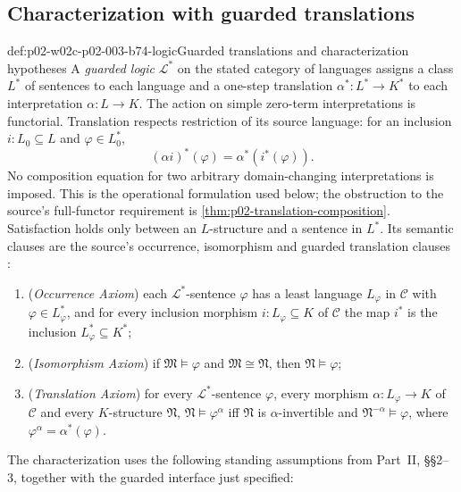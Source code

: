 
\subsection{Characterization with guarded translations}
\begin{hbdefinition}{def:p02-w02c-p02-003-b74-logic}{Guarded translations and characterization hypotheses}
A \emph{guarded logic} \(\mathcal L^{\ast}\) on the stated category of
languages assigns a class \(L^{\ast}\) of sentences to each language
and a one-step translation \(\alpha^{\ast}:L^{\ast}\to K^{\ast}\)
to each interpretation \(\alpha:L\to K\). The action on simple
zero-term interpretations is functorial. Translation respects restriction
of its source language: for an inclusion \(i:L_0\subseteq L\) and
\(\varphi\in L_0^{\ast}\),
\[
 (\alpha i)^{\ast}(\varphi)=\alpha^{\ast}(i^{\ast}(\varphi)).
\]
No composition equation for two arbitrary domain-changing
interpretations is imposed. This is the operational formulation used
below; the obstruction to the source's full-functor requirement is
\cref{thm:p02-translation-composition}. Satisfaction holds only between
an \(L\)-structure and a sentence in \(L^{\ast}\). Its semantic clauses
are the source's occurrence, isomorphism and guarded translation clauses
\cite[Part~I, \S7, pp.~234--235]{Barwise1974Axioms}:
\begin{enumerate}
\item (\emph{Occurrence Axiom}) each \(\mathcal L^{\ast}\)-sentence
      \(\varphi\) has a least language \(L_\varphi\) in \(\mathcal C\) with
      \(\varphi\in L_\varphi^{\ast}\), and for every inclusion morphism
      \(i:L_\varphi\subseteq K\) of \(\mathcal C\) the map \(i^{\ast}\) is the
      inclusion \(L_\varphi^{\ast}\subseteq K^{\ast}\);
\item (\emph{Isomorphism Axiom}) if \(\mathfrak M\models\varphi\) and
      \(\mathfrak M\cong\mathfrak N\), then \(\mathfrak N\models\varphi\);
\item (\emph{Translation Axiom}) for every \(\mathcal L^{\ast}\)-sentence
      \(\varphi\), every morphism \(\alpha:L_\varphi\to K\) of \(\mathcal C\)
      and every \(K\)-structure \(\mathfrak N\),
      \(\mathfrak N\models\varphi^{\alpha}\) iff \(\mathfrak N\) is
      \(\alpha\)-invertible and \(\mathfrak N^{-\alpha}\models\varphi\),
      where \(\varphi^{\alpha}=\alpha^{\ast}(\varphi)\).
\end{enumerate}
The characterization uses the following standing assumptions from
Part~II, \S\S2--3, together with the guarded interface just specified:

\end{hbdefinition}
